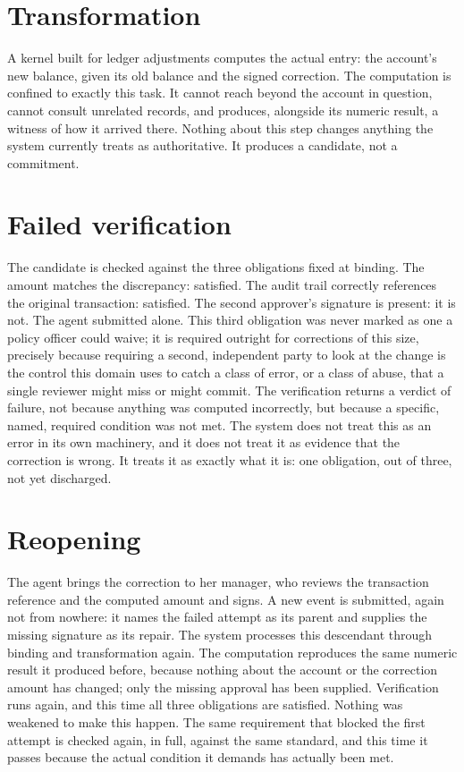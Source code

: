 \documentclass[11pt,openany]{book}
\begin{document}
\section*{Transformation}

A kernel built for ledger adjustments computes the actual entry: the
account's new balance, given its old balance and the signed correction. The
computation is confined to exactly this task. It cannot reach beyond the
account in question, cannot consult unrelated records, and produces, alongside
its numeric result, a witness of how it arrived there. Nothing about this step
changes anything the system currently treats as authoritative. It produces a
candidate, not a commitment.

\section*{Failed verification}

The candidate is checked against the three obligations fixed at binding. The
amount matches the discrepancy: satisfied. The audit trail correctly
references the original transaction: satisfied. The second approver's
signature is present: it is not. The agent submitted alone. This third
obligation was never marked as one a policy officer could waive; it is required
outright for corrections of this size, precisely because requiring a second,
independent party to look at the change is the control this domain uses to
catch a class of error, or a class of abuse, that a single reviewer might miss
or might commit. The verification returns a verdict of failure, not because
anything was computed incorrectly, but because a specific, named, required
condition was not met. The system does not treat this as an error in its own
machinery, and it does not treat it as evidence that the correction is wrong.
It treats it as exactly what it is: one obligation, out of three, not yet
discharged.

\section*{Reopening}

The agent brings the correction to her manager, who reviews the transaction
reference and the computed amount and signs. A new event is submitted, again
not from nowhere: it names the failed attempt as its parent and supplies the
missing signature as its repair. The system processes this descendant through
binding and transformation again. The computation reproduces the same numeric
result it produced before, because nothing about the account or the correction
amount has changed; only the missing approval has been supplied. Verification
runs again, and this time all three obligations are satisfied. Nothing was
weakened to make this happen. The same requirement that blocked the first
attempt is checked again, in full, against the same standard, and this time it
passes because the actual condition it demands has actually been met.
\end{document}
